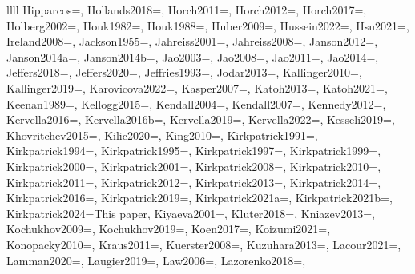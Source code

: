 \documentclass[twocolumn,tighten,twocolappendix]{aastex631}
\begin{document}
\begin{deluxetable*}{llll}
{Hipparcos=\cite{vanleeuwen2007},
Hollands2018=\cite{hollands2018},
Horch2011=\cite{horch2011},
Horch2012=\cite{horch2012},
Horch2017=\cite{horch2017},
Holberg2002=\cite{holberg2002},
Houk1982=\cite{houk1982},
Houk1988=\cite{houk1988},
Huber2009=\cite{huber2009},
Hussein2022=\cite{hussein2022},
Hsu2021=\cite{hsu2021},
Ireland2008=\cite{ireland2008},
Jackson1955=\cite{jackson1955},
Jahreiss2001=\cite{jahreiss2001},
Jahreiss2008=\cite{jahreiss2008},
Janson2012=\cite{janson2012},
Janson2014a=\cite{janson2014a},
Janson2014b=\cite{janson2014b},
Jao2003=\cite{jao2003},
Jao2008=\cite{jao2008},
Jao2011=\cite{jao2011},
Jao2014=\cite{jao2014},
Jeffers2018=\cite{jeffers2018},
Jeffers2020=\cite{jeffers2020},
Jeffries1993=\cite{jeffries1993},
Jodar2013=\cite{jodar2013},
Kallinger2010=\cite{kallinger2010},
Kallinger2019=\cite{kallinger2019},
Karovicova2022=\cite{karovicova2022},
Kasper2007=\cite{kasper2007},
Katoh2013=\cite{katoh2013},
Katoh2021=\cite{katoh2021},
Keenan1989=\cite{keenan1989},
Kellogg2015=\cite{kellogg2015},
Kendall2004=\cite{kendall2004},
Kendall2007=\cite{kendall2007},
Kennedy2012=\cite{kennedy2012},
Kervella2016=\cite{kervella2016},
Kervella2016b=\cite{kervella2016b},
Kervella2019=\cite{kervella2019},
Kervella2022=\cite{kervella2022},
Kesseli2019=\cite{kesseli2019},
Khovritchev2015=\cite{khovritchev2015},
Kilic2020=\cite{kilic2020},
King2010=\cite{king2010},
Kirkpatrick1991=\cite{kirkpatrick1991},
Kirkpatrick1994=\cite{kirkpatrick1994},
Kirkpatrick1995=\cite{kirkpatrick1995},
Kirkpatrick1997=\cite{kirkpatrick1997},
Kirkpatrick1999=\cite{kirkpatrick1999},
Kirkpatrick2000=\cite{kirkpatrick2000},
Kirkpatrick2001=\cite{kirkpatrick2001},
Kirkpatrick2008=\cite{kirkpatrick2008},
Kirkpatrick2010=\cite{kirkpatrick2010},
Kirkpatrick2011=\cite{kirkpatrick2011},
Kirkpatrick2012=\cite{kirkpatrick2012},
Kirkpatrick2013=\cite{kirkpatrick2013},
Kirkpatrick2014=\cite{kirkpatrick2014},
Kirkpatrick2016=\cite{kirkpatrick2016},
Kirkpatrick2019=\cite{kirkpatrick2019},
Kirkpatrick2021a=\cite{kirkpatrick2021},
Kirkpatrick2021b=\cite{kirkpatrick2021b},
Kirkpatrick2024=This paper,
Kiyaeva2001=\cite{kiyaeva2001},
Kluter2018=\cite{kluter2018},
Kniazev2013=\cite{kniazev2013},
Kochukhov2009=\cite{kochukhov2009},
Kochukhov2019=\cite{kochukhov2019},
Koen2017=\cite{koen2017},
Koizumi2021=\cite{koizumi2021},
Konopacky2010=\cite{konopacky2010},
Kraus2011=\cite{kraus2011},
Kuerster2008=\cite{kuerster2008},
Kuzuhara2013=\cite{kuzuhara2013},
Lacour2021=\cite{lacour2021},
Lamman2020=\cite{lamman2020},
Laugier2019=\cite{laugier2019},
Law2006=\cite{law2006},
Lazorenko2018=\cite{lazorenko2018},
}
\end{deluxetable*}
\end{document}
